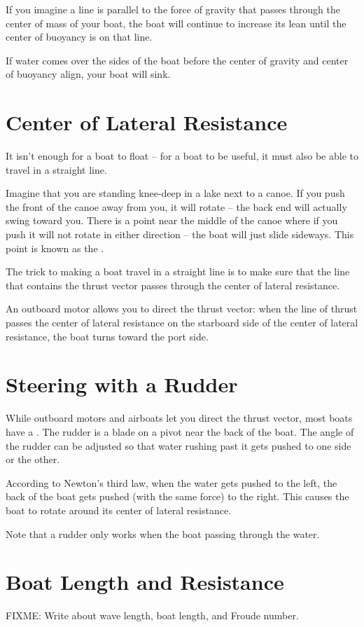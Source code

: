 If you imagine a line is parallel to the force of gravity that passes through the center of mass of your boat,   the boat will continue to increase its lean until
the center of buoyancy is on that line.  

If water comes over the sides of the boat before the center of gravity and center of buoyancy align,  your boat will sink.

\section{Center of Lateral Resistance}

It isn't enough for a boat to float -- for a boat to be useful,  it must also be able to travel in a straight line.

Imagine that you are standing knee-deep in a lake next to a canoe.  If you push the front of the canoe away from you,  it will rotate -- the back end will actually
swing toward you.   There is a point near the middle of the canoe where if you push it will not rotate in either direction -- the boat will just slide sideways.  This point is known as the .

The trick to making a boat travel in a straight line is to make sure that the line that contains the thrust vector passes through the center of lateral resistance.

An outboard motor allows you to direct the thrust vector: when the line of thrust passes the center of lateral resistance on the starboard side of the center of lateral resistance,  the boat turns toward the port side.

\section{Steering with a Rudder}
 
While outboard motors and airboats let you direct the thrust vector,  most boats have a .  The rudder is a blade on a pivot near the back of 
the boat.   The angle of the rudder can be adjusted so that water rushing past it gets pushed to one side or the other.

According to Newton's third law,  when the water gets pushed to the left,  the back of the boat gets pushed (with the same force) to the right.  This causes the boat to rotate around its center of lateral resistance.

Note that a rudder only works when the boat passing through the water. 

\section{Boat Length and Resistance}

FIXME: Write about wave length,  boat length, and Froude number.






